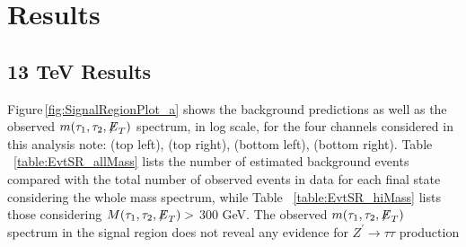 \section{Results}\label{sec:results}

\subsection{13 TeV Results}

Figure\,\ref{fig:SignalRegionPlot_a} shows the background predictions as well as the observed $m(\tau_{1},\tau_{2},{\not\mathrel{E}}_T)$ spectrum, in log scale, for the four 
channels considered in this analysis note: \mutau (top left), \ditauhad (top right), \etau (bottom left), \emu (bottom right). 
Table ~\ref{table:EvtSR_allMass} lists the number of estimated background events compared with the total number of observed events in data for each final state
considering the whole mass spectrum, while Table ~\ref{table:EvtSR_hiMass} lists those considering $M(\tau_1,\tau_2,{\not\mathrel{E}}_T) >$ 300 GeV.
The observed $m(\tau_{1},\tau_{2},{\not\mathrel{E}}_T)$ spectrum in the signal region does not reveal any evidence for $Z^{\prime}\to\tau\tau$ production 
